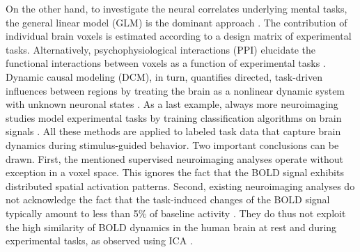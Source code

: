 \documentclass{article} %
\begin{document}
On the other hand, to investigate
the neural correlates underlying mental tasks,
the general linear model (GLM) is the dominant approach \cite{friston94}.
The contribution of
individual brain voxels is estimated
according to a design matrix of experimental tasks.
Alternatively, psychophysiological interactions (PPI)
elucidate the functional interactions between voxels as a function
of experimental tasks \cite{friston97}.
Dynamic causal modeling (DCM), in turn, quantifies directed,
task-driven influences between regions
by treating the brain as a nonlinear dynamic system with unknown
neuronal states \cite{stephan04}.
As a last example, always more neuroimaging studies model
experimental tasks by training classification algorithms on brain signals
\cite{poldrack09decoding}.
All these methods are applied to labeled task data that capture brain dynamics
during stimulus-guided behavior.
Two important conclusions can be drawn.
First, the mentioned supervised neuroimaging analyses operate
without exception in a voxel space. This ignores the fact that the BOLD
signal exhibits distributed spatial activation patterns.
Second, existing neuroimaging analyses do not acknowledge the fact that the
task-induced changes of the BOLD signal typically amount to less than 5\%
of baseline activity \cite{fox07}. They do thus not exploit the high similarity
of BOLD dynamics in the human brain at rest and during experimental tasks,
as observed using ICA \cite{smith2009}.
\end{document}
